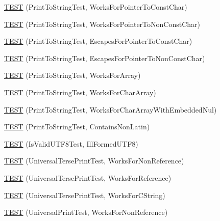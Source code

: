 \begin{DoxyCompactItemize}
\item 
\mbox{\hyperlink{namespacetesting_1_1gtest__printers__test_a68100148758516ebab9c761ca7778586}{T\+E\+ST}} (Print\+To\+String\+Test, Works\+For\+Pointer\+To\+Const\+Char)
\item 
\mbox{\hyperlink{namespacetesting_1_1gtest__printers__test_a1db34d8760c17157572ce2877007d15a}{T\+E\+ST}} (Print\+To\+String\+Test, Works\+For\+Pointer\+To\+Non\+Const\+Char)
\item 
\mbox{\hyperlink{namespacetesting_1_1gtest__printers__test_ab8fce4287e837cfcd851ded56b62f9ce}{T\+E\+ST}} (Print\+To\+String\+Test, Escapes\+For\+Pointer\+To\+Const\+Char)
\item 
\mbox{\hyperlink{namespacetesting_1_1gtest__printers__test_a7203081ef422f0835643d2c54b8ebf28}{T\+E\+ST}} (Print\+To\+String\+Test, Escapes\+For\+Pointer\+To\+Non\+Const\+Char)
\item 
\mbox{\hyperlink{namespacetesting_1_1gtest__printers__test_a78bd89af8a8505880b78ec2a001d3cb8}{T\+E\+ST}} (Print\+To\+String\+Test, Works\+For\+Array)
\item 
\mbox{\hyperlink{namespacetesting_1_1gtest__printers__test_ad122dc21e7ebad023d7048ef117a1129}{T\+E\+ST}} (Print\+To\+String\+Test, Works\+For\+Char\+Array)
\item 
\mbox{\hyperlink{namespacetesting_1_1gtest__printers__test_a65e208358dddc7747f4519410c71d877}{T\+E\+ST}} (Print\+To\+String\+Test, Works\+For\+Char\+Array\+With\+Embedded\+Nul)
\item 
\mbox{\hyperlink{namespacetesting_1_1gtest__printers__test_aa313c2e91ba3b712501d6e7f393a592a}{T\+E\+ST}} (Print\+To\+String\+Test, Contains\+Non\+Latin)
\item 
\mbox{\hyperlink{namespacetesting_1_1gtest__printers__test_a5d5349c44a2f23e585ea503cff88056e}{T\+E\+ST}} (Is\+Valid\+U\+T\+F8\+Test, Ill\+Formed\+U\+T\+F8)
\item 
\mbox{\hyperlink{namespacetesting_1_1gtest__printers__test_ab49ff6527b0b01411b725fe46e1af65c}{T\+E\+ST}} (Universal\+Terse\+Print\+Test, Works\+For\+Non\+Reference)
\item 
\mbox{\hyperlink{namespacetesting_1_1gtest__printers__test_ab7adb58a0e08e0830157a5a1c7bceac5}{T\+E\+ST}} (Universal\+Terse\+Print\+Test, Works\+For\+Reference)
\item 
\mbox{\hyperlink{namespacetesting_1_1gtest__printers__test_ab11252e228a240a349d747546bc222d2}{T\+E\+ST}} (Universal\+Terse\+Print\+Test, Works\+For\+C\+String)
\item 
\mbox{\hyperlink{namespacetesting_1_1gtest__printers__test_a43d4efc91c2ea7d8220891df9b0437df}{T\+E\+ST}} (Universal\+Print\+Test, Works\+For\+Non\+Reference)

\end{DoxyCompactItemize}
